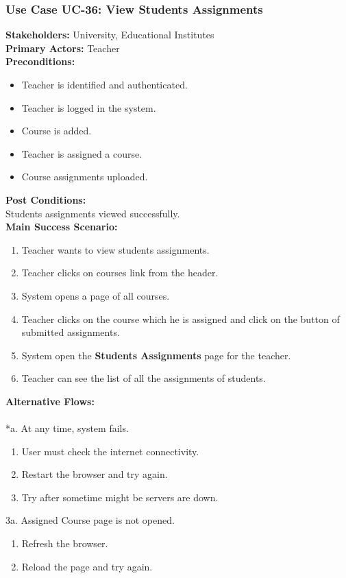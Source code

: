 \documentclass[12pt]{article}
\begin{document}
\subsubsection{Use Case UC-36: View Students Assignments}
\textbf{Stakeholders: } University, Educational Institutes \\
\textbf{Primary Actors: } Teacher \\
\textbf{Preconditions:}
\begin{itemize}
\item Teacher is identified and authenticated.
\item Teacher is logged in the system.
\item Course is added.
\item Teacher is assigned a course.
\item Course assignments uploaded.
\end{itemize}
\textbf{Post Conditions: }\\
 Students assignments viewed successfully.\\
\textbf{Main Success Scenario:}
\begin{enumerate}
\item Teacher wants to view students assignments.
\item Teacher clicks on courses link from the header.
\item System opens a page of all courses.
\item Teacher clicks on the course which he is assigned and click on the button of submitted assignments.
\item System open the \textbf{Students Assignments} page for the teacher.
\item Teacher can see the list of all the assignments of students.
\end{enumerate}
\textbf{Alternative Flows:}\\
\\
*a. At any time, system fails.
\begin{enumerate}
\item User must check the internet connectivity.
\item Restart the browser and try again.
\item Try after sometime might be servers are down.
\end{enumerate}
3a. Assigned Course page is not opened.
\begin{enumerate}
\item Refresh the browser.
\item Reload the page and try again.
\end{enumerate}
\end{document}
